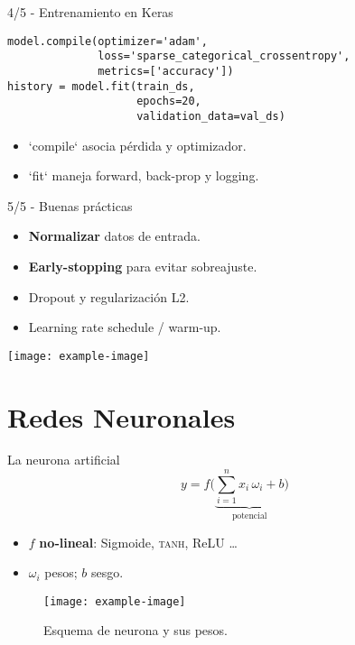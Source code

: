 \documentclass[12pt,spanish]{beamer}
\begin{document}
\begin{frame}[fragile]{4/5  -  Entrenamiento en Keras}
  \begin{verbatim}
model.compile(optimizer='adam',
              loss='sparse_categorical_crossentropy',
              metrics=['accuracy'])
history = model.fit(train_ds,
                    epochs=20,
                    validation_data=val_ds)
  \end{verbatim}
  \begin{itemize}
    \item `compile` asocia pérdida y optimizador.
    \item `fit` maneja forward, back-prop y logging.
  \end{itemize}
\end{frame}

\begin{frame}{5/5  -  Buenas prácticas}
  \begin{itemize}
    \item \textbf{Normalizar} datos de entrada.
    \item \textbf{Early-stopping} para evitar sobreajuste.
    \item Dropout y regularización L2.
    \item Learning rate schedule / warm-up.
  \end{itemize}
  \centering
  \texttt{[image: example-image]}
\end{frame}




\section{Redes Neuronales}
\begin{frame}{La neurona artificial}
  \begin{equation*}
    y = f\!\big(\underbrace{\sum_{i=1}^{n} x_i\,\omega_i + b}_{\text{potencial}}\big)
  \end{equation*}
  \begin{itemize}
    \item $f$ \textbf{no‑lineal}: Sigmoide, \textsc{tanh}, ReLU \ldots
    \item $\omega_i$ pesos; $b$ sesgo.
  \end{itemize}
  \begin{figure}[h]
    \centering
    \texttt{[image: example-image]}
    \caption{Esquema de neurona y sus pesos.}
  \end{figure}
\end{frame}
\end{document}
